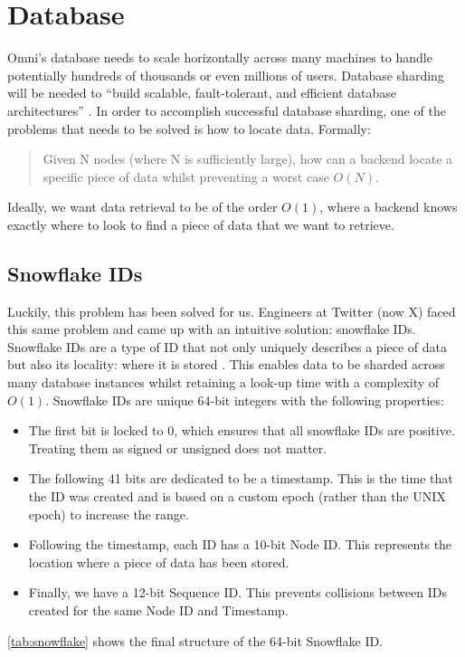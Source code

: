 \section{Database}
\label{sec:design-system-database}
Omni's database needs to scale horizontally across many machines to handle potentially hundreds of thousands or even millions of users. Database sharding will be needed to ``build scalable, fault-tolerant, and efficient database architectures'' \citep{shethiya2025load}.
In order to accomplish successful database sharding, one of the problems that needs to be solved is how to locate data. Formally:
\begin{quotation} %
Given N nodes (where N is sufficiently large), how can a backend locate a specific piece of data whilst preventing a worst case $O(N)$.
\end{quotation}
Ideally, we want data retrieval to be of the order $O(1)$, where a backend knows exactly where to look to find a piece of data that we want to retrieve.

\subsection{Snowflake IDs} 
\label{sec:design-system-database-snowflake}
Luckily, this problem has been solved for us. Engineers at Twitter (now X) faced this same problem and came up with an intuitive solution: snowflake IDs. Snowflake IDs are a type of ID that not only uniquely describes a piece of data but also its locality: where it is stored \citep{2010snowflake}. This enables data to be sharded across many database instances whilst retaining a look-up time with a complexity of $O(1)$.
Snowflake IDs are unique 64-bit integers with the following properties:
\begin{itemize}
    \item The first bit is locked to 0, which ensures that all snowflake IDs are positive. Treating them as signed or unsigned does not matter.
    \item The following 41 bits are dedicated to be a timestamp. This is the time that the ID was created and is based on a custom epoch (rather than the UNIX epoch) to increase the range.
    \item Following the timestamp, each ID has a 10-bit Node ID. This represents the location where a piece of data has been stored.
    \item Finally, we have a 12-bit Sequence ID. This prevents collisions between IDs created for the same Node ID and Timestamp.
\end{itemize}
\ref{tab:snowflake} shows the final structure of the 64-bit Snowflake ID.

